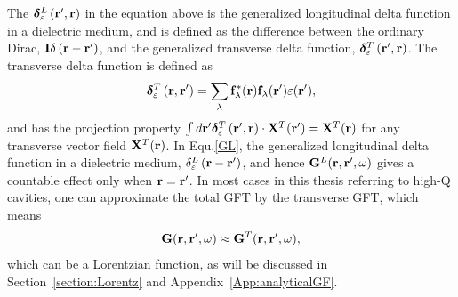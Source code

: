The $\boldsymbol{\delta}_{\varepsilon}^L \left(\mathbf{r}',\mathbf{r}\right)$ in the equation above is the generalized longitudinal delta function in a dielectric medium, and is defined as the difference between the ordinary Dirac, $\mathbf{I} \delta \left(\mathbf{r}-\mathbf{r}'\right)$,
and the generalized transverse delta function, $\boldsymbol{\delta}_{\varepsilon}^T \left(\mathbf{r}',\mathbf{r}\right)$. The transverse delta function is defined as
\begin{equation}
\boldsymbol{\delta}_{\varepsilon}^T \left(\mathbf{r},\mathbf{r}'\right)
=\sum_{\lambda}{\mathbf{f}_\lambda^*(\mathbf{r})\mathbf{f}_\lambda(\mathbf{r}') \varepsilon(\mathbf{r}')},
\end{equation}
and has the projection property $\int{d\mathbf{r}' \boldsymbol{\delta}_{\varepsilon}^T \left(\mathbf{r}',\mathbf{r}\right) \cdot \mathbf{X}^T(\mathbf{r}')}=\mathbf{X}^T(\mathbf{r})$ for any transverse vector field  $\mathbf{X}^T(\mathbf{r})$.
In Equ.\eqref{GL}, the generalized longitudinal delta function in a dielectric medium, $\delta_{\varepsilon}^L \left(\mathbf{r}-\mathbf{r}'\right)$, and hence $\mathbf{G}^L(\mathbf{r},\mathbf{r}',\omega)$ gives a countable effect only when $\mathbf{r}=\mathbf{r}'$. In most cases in this thesis referring to high-Q cavities, one can approximate the total GFT by the transverse GFT, which means
\begin{equation}
\mathbf{G}(\mathbf{r},\mathbf{r}',\omega) \approx \mathbf{G}^T(\mathbf{r},\mathbf{r}',\omega),
\end{equation}
which can be a Lorentzian function, as will be discussed in Section~\ref{section:Lorentz} and Appendix~\ref{App:analyticalGF}.

